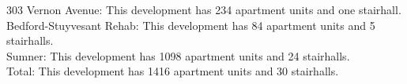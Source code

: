 {303 Vernon Avenue}: This development has 234 apartment units and one stairhall.\\{Bedford-Stuyvesant Rehab}: This development has 84 apartment units and 5 stairhalls.\\{Sumner}: This development has 1098 apartment units and 24 stairhalls.\\{Total}: This development has 1416 apartment units and 30 stairhalls.\\
